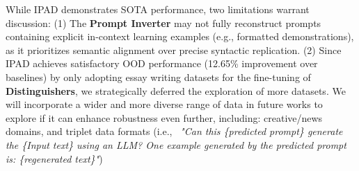 While IPAD demonstrates SOTA performance, two limitations warrant discussion:
%
(1) The \textbf{Prompt Inverter} may not fully reconstruct prompts containing explicit in-context learning examples (e.g., formatted demonstrations), as it prioritizes semantic alignment over precise syntactic replication.
%
(2) Since IPAD achieves satisfactory OOD performance (12.65\% improvement over baselines) by only adopting essay writing datasets for the fine-tuning of \textbf{Distinguishers}, we strategically deferred the exploration of more datasets. 
%
We will incorporate a wider and more diverse range of data in future works to explore if it can enhance robustness even further, including: creative/news domains, and triplet data formats (i.e., ~\textit{"Can this \{predicted prompt\} generate the \{Input text\} using an LLM? One example generated by the predicted prompt is: \{regenerated text\}"})

